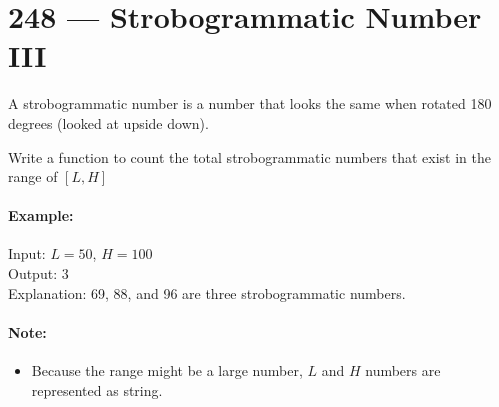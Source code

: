 \section{248 --- Strobogrammatic Number III}
A strobogrammatic number is a number that looks the same when rotated 180 degrees (looked at upside down).
\par
Write a function to count the total strobogrammatic numbers that exist in the range of $[L,H]$
\par
\paragraph{Example:}
\begin{flushleft}
Input: $L = 50$, $H = 100$
\\
Output: 3 
\\
Explanation: 69, 88, and 96 are three strobogrammatic numbers.
\end{flushleft}

\paragraph{Note:}
\begin{itemize}
\item Because the range might be a large number, $L$ and $H$ numbers are represented as string.
\end{itemize}


 